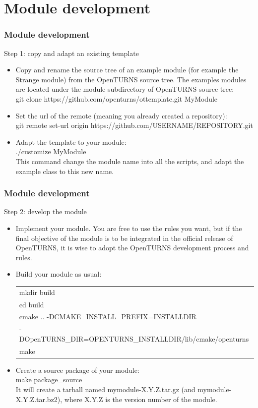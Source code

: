 \documentclass[8pt]{beamer}
\begin{document}
\section[Module development]{Module development}
\begin{frame}
  \frametitle{Module development}
  \begin{block}{Step 1: copy and adapt an existing template}
    \begin{itemize}
    \item Copy and rename the source tree of an example module (for example the Strange module) from the OpenTURNS source tree. The examples modules are located under the module subdirectory of OpenTURNS source tree:\\
      {\ttfamily git clone https://github.com/openturns/ottemplate.git MyModule}
    \item Set the url of the remote (meaning you already created a repository):\\
      {\ttfamily git remote set-url origin https://github.com/USERNAME/REPOSITORY.git}
    \item Adapt the template to your module:\\
      {\ttfamily ./customize MyModule}\\
      This command change the module name into all the scripts, and adapt the example class to this new name.
    \end{itemize}
  \end{block}
\end{frame}

\begin{frame}
  \frametitle{Module development}
  \begin{block}{Step 2: develop the module}
    \begin{itemize}
    \item Implement your module. You are free to use the rules you want, but if the final objective of the module is to be integrated in the official release of OpenTURNS, it is wise to adopt the OpenTURNS development process and rules.
    \item Build your module as usual:
      \begin{tabular}{l}
        \ttfamily mkdir build\\
        \ttfamily cd build\\
        \ttfamily cmake .. -DCMAKE\_INSTALL\_PREFIX=INSTALLDIR \\
        \ttfamily -DOpenTURNS\_DIR=OPENTURNS\_INSTALLDIR/lib/cmake/openturns\\
        \ttfamily make
      \end{tabular}
    \item Create a source package of your module:\\
      {\ttfamily make package\_source}\\
      It will create a tarball named mymodule-X.Y.Z.tar.gz (and mymodule-X.Y.Z.tar.bz2), where X.Y.Z is the version number of the module.
    \end{itemize}
  \end{block}
\end{frame}
\end{document}
